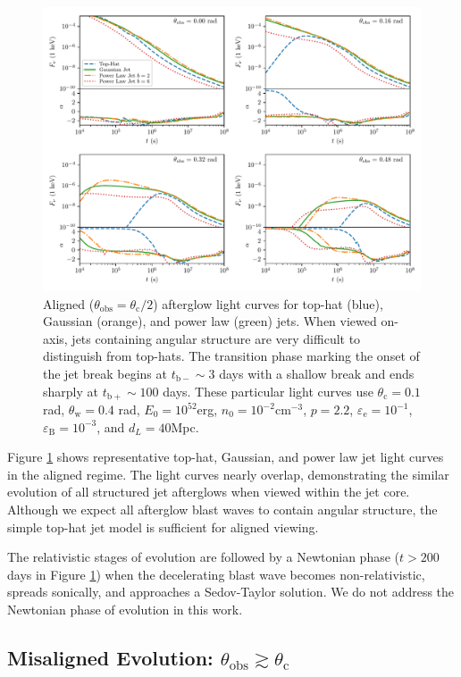 \documentclass[twocolumn]{aastex62}
\newcommand{\tbm}{\ensuremath{t_{\mathrm{b-}}}}
\newcommand{\tbp}{\ensuremath{t_{\mathrm{b+}}}}
\newcommand{\thobs}{\ensuremath{\theta_{\mathrm{obs}}}}
\newcommand{\thW}{\ensuremath{\theta_{\mathrm{w}}}}
\newcommand{\thC}{\ensuremath{\theta_{\mathrm{c}}}}
\newcommand{\epse}{\ensuremath{\varepsilon_{\mathrm{e}}}}
\newcommand{\epsB}{\ensuremath{\varepsilon_{\mathrm{B}}}}
\begin{document}
\begin{figure}
	\includegraphics[width=\textwidth]{figs/lc_thV_model_multi.pdf}
	\caption{Aligned ($\thobs = \thC/2$) afterglow light curves for top-hat (blue), Gaussian (orange), and power law (green) jets. When viewed on-axis, jets containing angular structure are very difficult to distinguish from top-hats.  The transition phase marking the onset of the jet break begins at $\tbm\sim3$ days with a shallow break and ends sharply at $\tbp \sim 100$ days.  These particular light curves use $\thC = 0.1$ rad, $\thW = 0.4$ rad, $E_0 = 10^{52}$erg, $n_0=10^{-2}$cm$^{-3}$, $p=2.2$, $\epse = 10^{-1}$, $\epsB = 10^{-3}$, and $d_L=40$Mpc. \label{fig:onaxis}}
\end{figure}

Figure \ref{fig:onaxis} shows representative top-hat, Gaussian, and power law jet light curves in the aligned regime.  The light curves nearly overlap, demonstrating the similar evolution of all structured jet afterglows when viewed within the jet core.  Although we expect all afterglow blast waves to contain angular structure, the simple top-hat jet model is sufficient for aligned viewing.

The relativistic stages of evolution are followed by a Newtonian phase ($t > 200$ days in Figure \ref{fig:onaxis}) when the decelerating blast wave becomes non-relativistic, spreads sonically, and approaches a Sedov-Taylor solution.  We do not address the Newtonian phase of evolution in this work.

\subsection{Misaligned Evolution: $\thobs \gtrsim \thC$} \label{subsec:misaligned}
\end{document}
